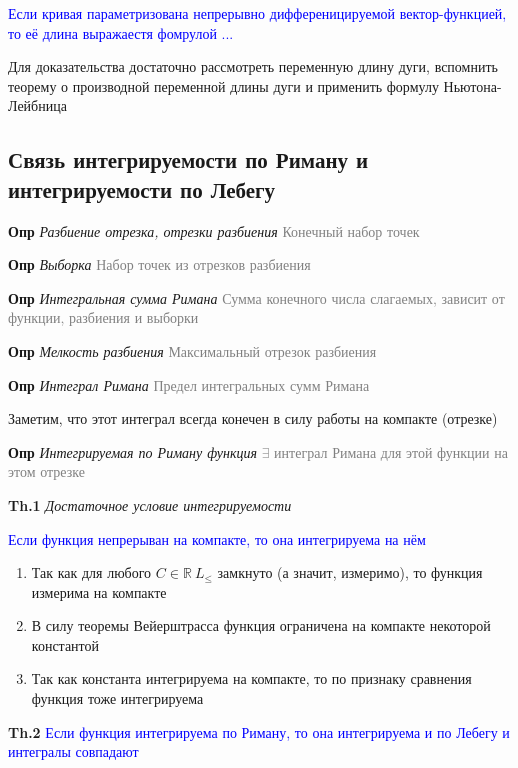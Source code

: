 \textcolor{blue}{Если кривая параметризована непрерывно дифференицируемой вектор-функцией, то её длина выражаестя
фомрулой ...}

Для доказательства достаточно рассмотреть переменную длину дуги, вспомнить теорему о производной переменной длины
дуги и применить формулу Ньютона-Лейбница

\subsection{Связь интегрируемости по Риману и интегрируемости по Лебегу}

\textbf{Опр} \textit{Разбиение отрезка, отрезки разбиения} \textcolor{gray}{Конечный набор точек}

\textbf{Опр} \textit{Выборка} \textcolor{gray}{Набор точек из отрезков разбиения}

\textbf{Опр} \textit{Интегральная сумма Римана} \textcolor{gray}{Сумма конечного числа слагаемых, зависит от
функции, разбиения и выборки}

\textbf{Опр} \textit{Мелкость разбиения} \textcolor{gray}{Максимальный отрезок разбиения}

\textbf{Опр} \textit{Интеграл Римана} \textcolor{gray}{Предел интегральных сумм Римана}

Заметим, что этот интеграл всегда конечен в силу работы на компакте (отрезке)

\textbf{Опр} \textit{Интегрируемая по Риману функция} \textcolor{gray}{$\exists$ интеграл Римана для этой функции
на этом отрезке}

\textbf{Th.1} \textit{Достаточное условие интегрируемости}

\textcolor{blue}{Если функция непрерыван на компакте, то она интегрируема на нём}

\begin{enumerate}
    \item Так как для любого $C \in \mathbb{R}~L_{\leq}$ замкнуто (а значит, измеримо), то функция измерима на
    компакте
    \item В силу теоремы Вейерштрасса функция ограничена на компакте некоторой константой
    \item Так как константа интегрируема на компакте, то по признаку сравнения функция тоже интегрируема
\end{enumerate}

\textbf{Th.2} \textcolor{blue}{Если функция интегрируема по Риману, то она интегрируема и по Лебегу и интегралы
совпадают}

